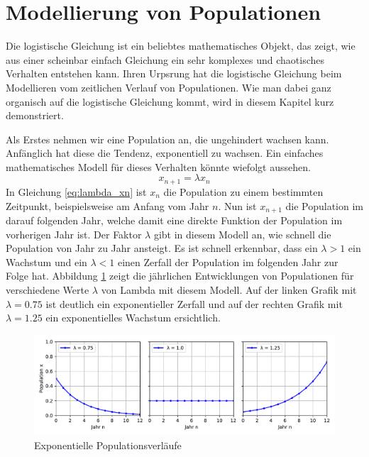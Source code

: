 %
%
%
\section{Modellierung von Populationen
\label{logistic:section:einleitung}}

Die logistische Gleichung ist ein beliebtes mathematisches Objekt,
das zeigt, wie aus einer scheinbar einfach Gleichung
ein sehr komplexes und chaotisches Verhalten entstehen kann. 
Ihren Urpsrung hat die logistische Gleichung beim Modellieren
vom zeitlichen Verlauf von Populationen. 
Wie man dabei ganz organisch auf die logistische Gleichung 
kommt, wird in diesem Kapitel kurz demonstriert. 

Als Erstes nehmen wir eine Population an, 
die ungehindert wachsen kann. 
Anfänglich hat diese die Tendenz, exponentiell zu wachsen. 
Ein einfaches mathematisches Modell für dieses Verhalten
könnte wiefolgt aussehen.
\begin{equation}
    \label{eq:lambda_xn}
    x_{n+1} = \lambda x_{n}
\end{equation}
In Gleichung \eqref{eq:lambda_xn} ist $x_{n}$ die Population zu einem bestimmten Zeitpunkt, 
beispielsweise am Anfang vom Jahr $n$. 
Nun ist $x_{n+1}$ die Population im darauf folgenden Jahr, 
welche damit eine direkte Funktion der Population im vorherigen
Jahr ist. 
Der Faktor $\lambda$ gibt in diesem Modell an, 
wie schnell die Population von Jahr zu Jahr ansteigt. 
Es ist schnell erkennbar, 
dass ein $\lambda > 1$ ein Wachstum und
ein $\lambda < 1$ einen Zerfall
der Population im folgenden Jahr zur Folge hat. 
Abbildung \ref{fig:pop_exp} zeigt die jährlichen
Entwicklungen von Populationen für verschiedene
Werte $\lambda$ von Lambda mit diesem Modell.
Auf der linken Grafik mit $\lambda = 0.75$ ist deutlich
ein exponentieller Zerfall und auf 
der rechten Grafik mit $\lambda = 1.25$
ein exponentielles Wachstum ersichtlich.
\begin{figure}
    \includegraphics[width=\linewidth]{papers/logistic/figures/pop_exp.pdf}
    \caption{Exponentielle Populationsverläufe}
    \label{fig:pop_exp}
\end{figure}


